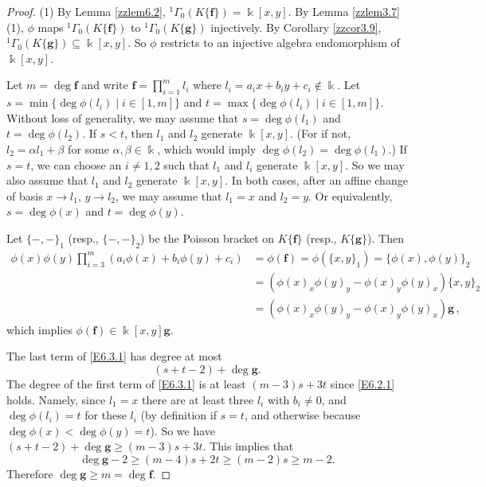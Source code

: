 \documentclass[12pt]{amsart}
\theoremstyle{plain}
\numberwithin{theorem}{section}
\numberwithin{equation}{theorem}
\theoremstyle{definition}
\newcommand \bff {{\mathbf{f}}}
\newcommand \bfg {{\mathbf{g}}}
\begin{document}
\begin{proof} 
(1) By Lemma \ref{zzlem6.2}, ${^1\Gamma}_{0}(K\{\bff\})=\Bbbk[x,y]$. By Lemma 
\ref{zzlem3.7}(1), $\phi$ maps ${^1\Gamma}_{0}(K\{\bff\})$ to 
${^1\Gamma}_{0}(K\{\bfg\})$ injectively. By Corollary \ref{zzcor3.9}, 
${^1\Gamma}_{0}(K\{\bfg\})\subseteq \Bbbk[x,y]$. So $\phi$ restricts to an 
injective algebra endomorphism of $\Bbbk[x,y]$. 

Let $m=\deg \bff$ and write $\bff=\prod_{i=1}^{m} l_i$ where
$l_i=a_i x+b_i y+c_i\not\in \Bbbk$. 
Let $s=\min\{ \deg\phi(l_i) \mid i\in [1,m]\}$ and
$t=\max\{ \deg \phi(l_i) \mid i\in [1,m]\}$. Without
loss of generality, we may assume that $s=\deg 
\phi(l_1)$ and $t=\deg \phi(l_2)$. If $s<t$, then 
$l_1$ and $l_2$ generate $\Bbbk[x,y]$. (For if not, $l_2 = \alpha l_1 + \beta$ for some $\alpha,\beta \in \Bbbk$, which would imply $\deg \phi(l_2) = \deg \phi(l_1)$.)  If $s=t$, we
can choose an $i \ne 1,2$ such that $l_1$ and $l_i$ 
generate $\Bbbk[x,y]$. So we may also assume that 
$l_1$ and $l_2$ generate $\Bbbk[x,y]$. In both cases, 
after an affine change of basis $x\to l_1$, $y\to l_2$,
we may assume that $l_1=x$ and $l_2=y$. Or equivalently, 
$s= \deg \phi(x)$ and $t= \deg \phi(y)$. 

Let $\{-,-\}_1$ (resp., $\{-,-\}_2$) be the Poisson bracket on 
$K\{\bff\}$ (resp., $K\{\bfg\}$). Then
\begin{equation}
\label{E6.3.1}\tag{E6.3.1}
\begin{aligned}
\phi(x)\phi(y) 
\prod_{i=3}^{m} (a_i \phi(x)+ b_i \phi(y)+c_i) &= \phi(\bff) = \phi(\{x,y\}_1) = \{\phi(x),\phi(y)\}_2  \\
&= (\phi(x)_x \phi(y)_y-\phi(x)_y \phi(y)_x)\{x,y\}_2  \\
&=(\phi(x)_x \phi(y)_y-\phi(x)_y \phi(y)_x)\bfg \,,
\end{aligned}
\end{equation}
which implies $\phi(\bff) \in \Bbbk[x,y] \bfg$.

The last term of \eqref{E6.3.1} has degree at most 
$$(s+t-2)+\deg \bfg.$$
The degree of the first term of \eqref{E6.3.1} is at least 
$(m-3)s+3 t$ since \eqref{E6.2.1} holds.  Namely, since $l_1 = x$ there are at least three $l_i$ with $b_i \ne 0$, and $\deg \phi(l_i) = t$ for these $l_i$ (by definition if $s=t$, 
and otherwise because 
$\deg \phi(x) < \deg \phi(y) = t$).
So we have
$(s+t-2)+\deg \bfg\geq (m-3) s+3t$.
This implies that  
\begin{equation}
\label{E6.3.2}\tag{E6.3.2}
\deg \bfg-2\geq (m-4)s+ 2 t\geq (m-2)s \ge m-2.
\end{equation}
Therefore $\deg \bfg\geq m=\deg \bff$. 


\end{proof}
\end{document}
